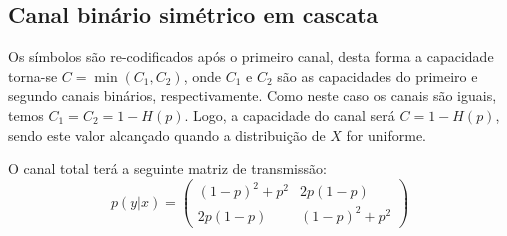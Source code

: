 \subsection{Canal binário simétrico em cascata}

\begin{questions}

\begin{solution}
  Os símbolos são re-codificados após o primeiro canal, desta forma a
  capacidade torna-se $C = \min (C_1, C_2)$, onde $C_1$ e $C_2$ são as
  capacidades do primeiro e segundo canais binários, respectivamente.
  Como neste caso os canais são iguais, temos $C_1 = C_2 = 1 - H(p)$.
  Logo, a capacidade do canal será $C = 1 - H(p)$, sendo este valor alcançado
  quando a distribuição de $X$ for uniforme.
\end{solution}


\begin{solution}
O canal total terá a seguinte matriz de transmissão:
\begin{equation}
p(y|x) = 
\begin{pmatrix}
(1-p)^2 + p^2 & 2p (1-p) \\
2p (1-p)      & (1-p)^2 + p^2
\end{pmatrix}
\end{equation}



\end{solution}
\end{questions}
